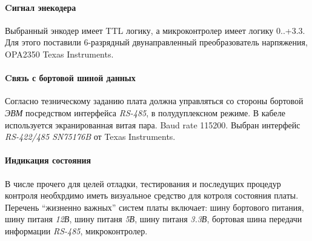 \documentclass{article}
\begin{document}
\paragraph{Cигнал энекодера}
Выбранный энкодер имеет TTL логику, а микроконтролер имеет логику 0..+3.3.
Для этого поставили 6-разрядный двунаправленный преобразователь нарпяжения,
OPA2350 Texas Instruments.

\paragraph{Cвязь с бортовой шиной данных}
Согласно тезническому заданию плата должна управляться со стороны бортовой
\textit{ЭВМ} посредством интерфейса \textit{RS-485}, в полудуплексном режиме.
В кабеле используется экранированная витая пара.
Baud rate 115200. Выбран интерфейс \textit{RS-422/485 SN75176B} от Texas Instruments.

%

\paragraph{Индикация состояния}
В числе прочего для целей отладки, тестирования и последущих процедур контроля
необхрдимо иметь визуальное средство для котроля состояния платы.
Перечень ``жизненно важных'' систем платы включает:
шину бортового питания,
шину питаня \textit{12В},
шину питаня \textit{5В},
шину питаня \textit{3.3В},
бортовая шина передачи информации \textit{RS-485},
микроконтролер.
\end{document}
